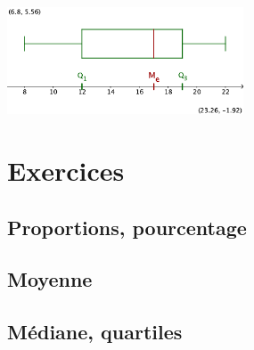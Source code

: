 \begin{center}
  \includegraphics[width=7cm]{Stats_Fig4_DiagBoite.png}  
\end{center}




\section{Exercices}

\subsection{Proportions, pourcentage}


\subsection{Moyenne}


\subsection{Médiane, quartiles}


